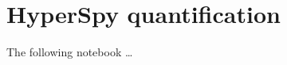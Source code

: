 \chapter{HyperSpy quantification}
\label{appendix:HSquant}

The following notebook \dots
% 








